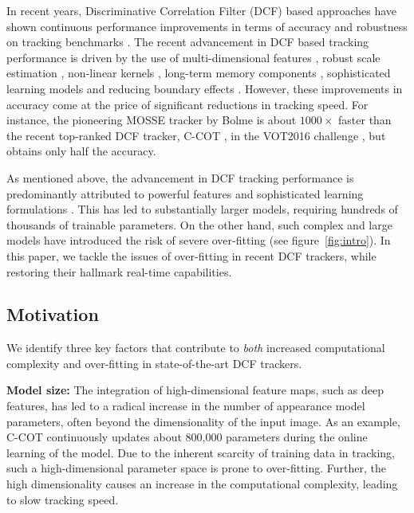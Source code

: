 \documentclass[10pt,twocolumn,letterpaper]{article}
\newcommand{\parsection}[1]{\noindent\textbf{#1:}}
\begin{document}
In recent years, Discriminative Correlation Filter (DCF) based approaches have shown continuous performance improvements in terms of accuracy and robustness on tracking benchmarks \cite{VOT2016,OTB2015}. The recent advancement in DCF based tracking performance is driven by the use of multi-dimensional features \cite{DanelljanCVPR14,galoogahiICCV13}, robust scale estimation \cite{DanelljanBMVC14,DanelljanTPAMI2016}, non-linear kernels \cite{Henriques14}, long-term memory components \cite{LTC_CVPR15}, sophisticated learning models \cite{KAUST_ECCV16,DanelljanCVPR2016a} and reducing boundary effects \cite{DanelljanICCV2015,GaloogahiCVPR2015}. However, these improvements in accuracy come at the price of significant reductions in tracking speed. For instance, the pioneering MOSSE tracker by Bolme \etal \cite{MOSSE2010} is about $1000 \times$ faster than the recent top-ranked DCF tracker, C-COT \cite{DanelljanECCV2016}, in the VOT2016 challenge \cite{VOT2016}, but obtains only half the accuracy.

As mentioned above, the advancement in DCF tracking performance is predominantly attributed to powerful features and sophisticated learning formulations \cite{DanelljanVOT2015,DanelljanECCV2016,HCF_ICCV15}. This has led to substantially larger models, requiring hundreds of thousands of trainable parameters. On the other hand, such complex and large models have introduced the risk of severe over-fitting (see figure~\ref{fig:intro}). In this paper, we tackle the issues of over-fitting in recent DCF trackers, while restoring their hallmark real-time capabilities.

\subsection{Motivation}

We identify three key factors that contribute to \emph{both} increased computational complexity and over-fitting in state-of-the-art DCF trackers.

\parsection{Model size}
The integration of high-dimensional feature maps, such as deep features, has led to a radical increase in the number of appearance model parameters, often beyond the dimensionality of the input image. As an example, C-COT \cite{DanelljanECCV2016} continuously updates about 800,000 parameters during the online learning of the model. Due to the inherent scarcity of training data in tracking, such a high-dimensional parameter space is prone to over-fitting. Further, the high dimensionality causes an increase in the computational complexity, leading to slow tracking speed.
\end{document}
